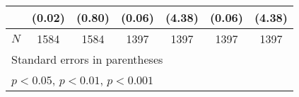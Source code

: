 {\begin{tabular}{l*{6}{c}}
            &      (0.02)         &      (0.80)         &      (0.06)         &      (4.38)         &      (0.06)         &      (4.38)         \\
\hline
\(N\)       &        1584         &        1584         &        1397         &        1397         &        1397         &        1397         \\
\hline\hline
\multicolumn{7}{l}{\footnotesize Standard errors in parentheses}\\
\multicolumn{7}{l}{\footnotesize \sym{*} \(p<0.05\), \sym{**} \(p<0.01\), \sym{***} \(p<0.001\)}\\
\end{tabular}
}
